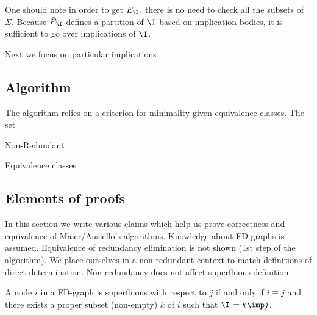 One should note in order to get $\bar{E}_{\I}$, there is no need to check all
the subsets of $\Sigma$. Because $\bar{E}_{\I}$ defines a partition of $\I$ 
based on implication bodies, it is sufficient to go over implications of $\I$.

\vspace{1.2em}

Next we focus on particular implications


\subsection{Algorithm}

The algorithm relies on a criterion for minimality given equivalence classes. 
The set 


\begin{algorithm}[H]


\caption{Non-Redundant}
\label{alg:Nonredun}
\end{algorithm}

\vspace{1.2em}

\begin{algorithm}[H]


\caption{Equivalence classes}
\label{alg:Equiv}
	
\end{algorithm}


\subsection{Elements of proofs}

In this section we write various claims which help us prove correctness and 
equivalence of Maier/Ausiello's algorithms. Knowledge about FD-graphs is 
assumed. Equivalence of redundancy elimination is not shown (1st step of 
the algorithm). We place ourselves in a non-redundant context to match
definitions of direct determination. Non-redundancy does not affect superfluous
definition.

\begin{proposition} \label{prop:maier.equiv_sup_sub}
A node $i$ in a FD-graph is superfluous with respect to $j$ if and only if 
$i \equiv j$ and there exists a proper subset (non-empty) $k$ of $i$ such 
that $\I \models k \imp j$. 
\end{proposition}

